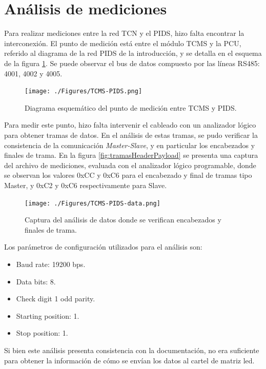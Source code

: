 \section{Análisis de mediciones}

Para realizar mediciones entre la red TCN y el PIDS, hizo falta encontrar la interconexión. El punto de medición está entre el módulo TCMS y la PCU, referido al diagrama de la red PIDS de la introducción, y se detalla en el esquema de la figura \ref{fig:TCMS-PIDS}. Se puede observar el bus de datos compuesto por las líneas RS485: 4001, 4002 y 4005.\\

\begin{figure}[H]
	\centering
	\texttt{[image: ./Figures/TCMS-PIDS.png]}
	\caption{Diagrama esquemático del punto de medición entre TCMS y PIDS.}
	\label{fig:TCMS-PIDS}
\end{figure}

Para medir este punto, hizo falta intervenir el cableado con un analizador lógico para obtener tramas de datos. En el análisis de estas tramas, se pudo verificar la consistencia de la comunicación \textit{Master-Slave}, y en particular los encabezados y finales de trama. En la figura \ref{fig:tramasHeaderPayload} se presenta una captura del archivo de mediciones, evaluada con el analizador lógico programable, donde se observan los valores  0xCC y 0xC6 para el encabezado y final de tramas tipo Master, y 0xC2 y 0xC6 respectivamente para Slave. \\

\begin{figure}[H]
	\centering
	\texttt{[image: ./Figures/TCMS-PIDS-data.png]}
	\caption{Captura del análisis de datos donde se verifican encabezados y finales de trama.}
	\label{fig:TCMS-PIDS-Data}
\end{figure}

Los parámetros de configuración utilizados para el análisis son:

\begin{itemize}
\item Baud rate: 19200 bps.
\item Data bits: 8.
\item Check digit 1 odd parity.
\item Starting position: 1.
\item Stop position: 1.
\end{itemize}

Si bien este análisis presenta consistencia con la documentación, no era suficiente para obtener la información de cómo se envían los datos al cartel de matriz led. \\

